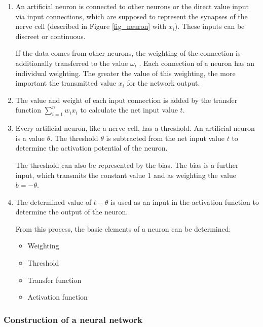 \begin{enumerate}

  \item An artificial neuron is connected to other neurons
        or the direct value input via input connections,
        which are supposed to represent the synapses of the
        nerve cell (described in Figure \ref{fig_neuron}
        with $x_i$). These inputs can be discreet or
        continuous.\cite{nne_beck}

        If the data comes from other neurons, the weighting
        of the connection is additionally transferred to
        the value $\omega_i$ . Each connection of a neuron
        has an individual weighting. The greater the value
        of this weighting, the more important the
        transmitted value $x_i$ for the network output.

  \item The value and weight of each input connection is
        added by the transfer function $\sum_{i=1}^{n}w_ix_i$
        to calculate the net input value $t$.


  \item Every artificial neuron, like a nerve cell, has a
        threshold. An artificial neuron is a value
        $\theta$. The threshold $\theta$ is subtracted from
        the net input value $t$ to determine the activation
        potential of the neuron.

        The threshold can also be represented by the bias.
        The bias is a further input, which transmits the
        constant value 1 and as weighting the value
        $b=-\theta$.

        

  \item The determined value of $t-\theta$ is used as an
        input in the activation function to determine the
        output of the neuron.

        From this process, the basic elements of a neuron
        can be determined:

        \begin{itemize}

          \item Weighting

          \item Threshold

          \item Transfer function

          \item Activation function

        \end{itemize}

\end{enumerate}

\subsubsection{Construction of a neural network}



